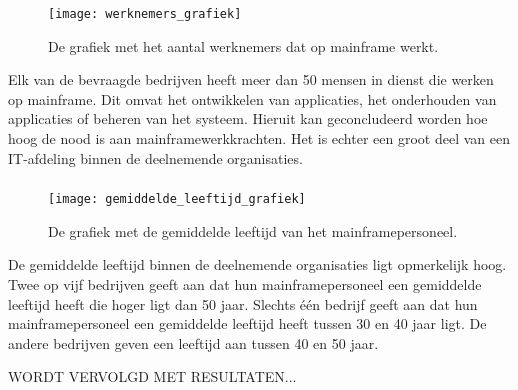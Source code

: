  \subsubsection{}
\label{sec:Wat is het aantal van werknemers die werk leveren dat te maken heeft met het ontwikkelen, onderhouden of beheren van een mainframe?}

 \begin{figure}[h]
    \centering
    \texttt{[image: werknemers\_grafiek]}
    \caption{De grafiek met het aantal werknemers dat op mainframe werkt.}
\end{figure}

Elk van de bevraagde bedrijven heeft meer dan 50 mensen in dienst die werken op mainframe. Dit omvat het ontwikkelen van applicaties, het onderhouden van applicaties of beheren van het systeem. Hieruit kan geconcludeerd worden hoe hoog de nood is aan mainframewerkkrachten. Het is echter een groot deel van een IT-afdeling binnen de deelnemende organisaties.

\newpage

 \subsubsection{}
\label{sec:Wat is de gemiddelde leeftijd van het mainframepersoneel?}

\begin{figure}[h]
    \centering
    \texttt{[image: gemiddelde\_leeftijd\_grafiek]}
    \caption{De grafiek met de gemiddelde leeftijd van het mainframepersoneel.}
\end{figure}


De gemiddelde leeftijd binnen de deelnemende organisaties ligt opmerkelijk hoog. Twee op vijf bedrijven geeft aan dat hun mainframepersoneel een gemiddelde leeftijd heeft die hoger ligt dan 50 jaar. Slechts één bedrijf geeft aan dat hun mainframepersoneel een gemiddelde leeftijd heeft tussen 30 en 40 jaar ligt. De andere bedrijven geven een leeftijd aan tussen 40 en 50 jaar. 

WORDT VERVOLGD MET RESULTATEN... 




